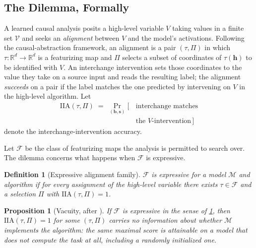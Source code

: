 \documentclass[11pt]{article}
\newtheorem{definition}{Definition}
\newtheorem{proposition}{Proposition}
\begin{document}
\subsection{The Dilemma, Formally}
\label{app:dilemma-statement}

A learned causal analysis posits a high-level variable $V$ taking values in a
finite set $\mathcal{V}$ and seeks an \emph{alignment} between $V$ and the
model's activations. Following the causal-abstraction framework, an alignment
is a pair $(\tau,\Pi)$ in which $\tau:\mathbb{R}^{d}\to\mathbb{R}^{d}$ is a
featurizing map and $\Pi$ selects a subset of coordinates of $\tau(\mathbf{h})$
to be identified with $V$. An interchange intervention sets those coordinates to
the value they take on a source input and reads the resulting label; the
alignment \emph{succeeds} on a pair if the label matches the one predicted by
intervening on $V$ in the high-level algorithm. Let
\begin{equation}
\label{eq:iia}
\begin{split}
\mathrm{IIA}(\tau,\Pi) \;=\; \Pr_{(\mathbf{b},\mathbf{s})}
\bigl[\,&\text{interchange matches} \\[-2pt]
&\text{the } V\text{-intervention}\,\bigr]
\end{split}
\end{equation}
denote the interchange-intervention accuracy.

Let $\mathcal{F}$ be the class of featurizing maps the analysis is permitted to
search over. The dilemma concerns what happens when $\mathcal{F}$ is
expressive.

\begin{definition}[Expressive alignment family]
\label{def:expressive}
$\mathcal{F}$ is \emph{expressive} for a model $\mathcal{M}$ and algorithm if for
every assignment of the high-level variable there exists $\tau\in\mathcal{F}$
and a selection $\Pi$ with $\mathrm{IIA}(\tau,\Pi)=1$.
\end{definition}

\begin{proposition}[Vacuity, after \citet{sutter2025nonlinear}]
\label{prop:vacuity}
If $\mathcal{F}$ is expressive in the sense of \cref{def:expressive}, then
$\mathrm{IIA}(\tau,\Pi)=1$ for some $(\tau,\Pi)$ carries no information about
whether $\mathcal{M}$ implements the algorithm: the same maximal score is
attainable on a model that does not compute the task at all, including a
randomly initialized one.
\end{proposition}
\end{document}
